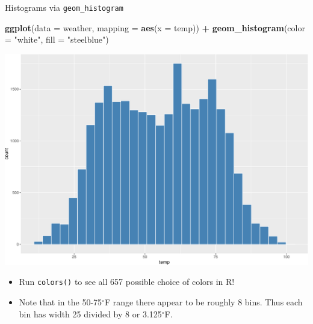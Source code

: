 \documentclass[
  ignorenonframetext,
]{beamer}
\newenvironment{Shaded}{\begin{snugshade}}{\end{snugshade}}
\newcommand{\AttributeTok}[1]{\textcolor[rgb]{0.13,0.29,0.53}{#1}}
\newcommand{\FunctionTok}[1]{\textcolor[rgb]{0.13,0.29,0.53}{\textbf{#1}}}
\newcommand{\NormalTok}[1]{#1}
\newcommand{\SpecialCharTok}[1]{\textcolor[rgb]{0.81,0.36,0.00}{\textbf{#1}}}
\newcommand{\StringTok}[1]{\textcolor[rgb]{0.31,0.60,0.02}{#1}}
\providecommand{\tightlist}{%
  \setlength{\itemsep}{0pt}\setlength{\parskip}{0pt}}
\begin{document}
\begin{frame}[fragile]{Histograms via \texttt{geom\_histogram}}
\protect\hypertarget{histograms-via-geom_histogram-3}{}
\tiny

\begin{Shaded}
\begin{Highlighting}[]
\FunctionTok{ggplot}\NormalTok{(}\AttributeTok{data =}\NormalTok{ weather, }\AttributeTok{mapping =} \FunctionTok{aes}\NormalTok{(}\AttributeTok{x =}\NormalTok{ temp)) }\SpecialCharTok{+}
  \FunctionTok{geom\_histogram}\NormalTok{(}\AttributeTok{color =} \StringTok{"white"}\NormalTok{, }\AttributeTok{fill =} \StringTok{"steelblue"}\NormalTok{)}
\end{Highlighting}
\end{Shaded}

\begin{center}\includegraphics[width=0.7\linewidth,height=0.5\textheight]{Week2_files/figure-beamer/unnamed-chunk-28-1} \end{center}
\normalsize

\begin{itemize}
\tightlist
\item
  Run \texttt{colors()} to see all 657 possible choice of colors in R!
\item
  Note that in the 50-75\(^{\circ}\)F range there appear to be roughly 8
  bins. Thus each bin has width 25 divided by 8 or 3.125\(^{\circ}\)F.
\end{itemize}
\end{frame}
\end{document}
